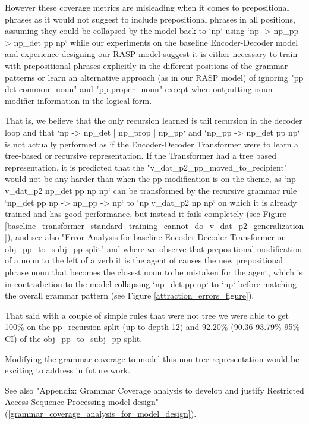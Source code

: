 \documentclass[11pt]{article}
\begin{document}
However these coverage metrics are misleading when it comes to prepositional phrases as it would not suggest to include prepositional phrases in all positions, assuming they could be collapsed by the model back to `np` using `np -> np\_pp -> np\_det pp np` while our experiments on the \cite{Wu2023} baseline Encoder-Decoder model and experience designing our RASP model suggest it is either necessary to train with prepositional phrases explicitly in the different positions of the grammar patterns or learn an alternative approach (as in our RASP model) of ignoring "pp det common\_noun" and "pp proper\_noun" except when outputting noun modifier information in the logical form.

That is, we believe that the only recursion learned is tail recursion in the decoder loop and that `np -> np\_det | np\_prop | np\_pp` and `np\_pp -> np\_det pp np` is not actually performed as if the Encoder-Decoder Transformer were to learn a tree-based or recursive representation. If the Transformer had a tree based representation, it is predicted that the "v\_dat\_p2\_pp\_moved\_to\_recipient" would not be any harder than when the pp modification is on the theme, as `np v\_dat\_p2 np\_det pp np np` can be transformed by the recursive grammar rule `np\_det pp np -> np\_pp -> np` to `np v\_dat\_p2 np np` on which it is already trained and has good performance, but instead it fails completely (see Figure \ref{baseline_transformer_standard_training_cannot_do_v_dat_p2_generalization}), and see also "Error Analysis for \cite{Wu2023} baseline Encoder-Decoder Transformer on obj\_pp\_to\_subj\_pp split" and where we observe that prepositional modification of a noun to the left of a verb it is the agent of causes the new prepositional phrase noun that becomes the closest noun to be mistaken for the agent, which is in contradiction to the model collapsing `np\_det pp np` to `np` before matching the overall grammar pattern (see Figure \ref{attraction_errors_figure}).

That said with a couple of simple rules that were not tree we were able to get 100\% on the pp\_recursion split (up to depth 12) and 92.20\% (90.36-93.79\% 95\% CI) of the obj\_pp\_to\_subj\_pp split.

Modifying the grammar coverage to model this non-tree representation would be exciting to address in future work.

See also "Appendix: Grammar Coverage analysis to develop and justify Restricted Access Sequence Processing model design" (\ref{grammar_coverage_analysis_for_model_design}).
\end{document}

